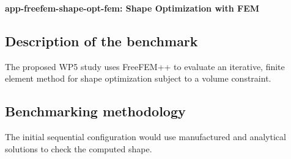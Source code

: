 \textbf{app-freefem-shape-opt-fem: Shape Optimization with FEM}
\label{sec:app:specs:app-freefem-shape-opt-fem}



\subsection{Description of the benchmark}
The proposed WP5 study uses FreeFEM++ to evaluate an iterative,
finite element method for shape optimization subject to a volume
constraint.

\subsection{Benchmarking methodology}
The initial sequential configuration would use manufactured and
analytical solutions to check the computed shape.
